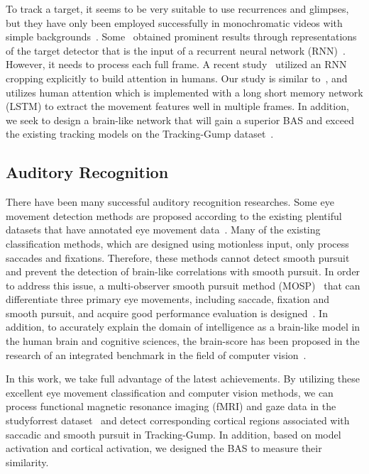 \documentclass[journal]{IEEEtran}
\begin{document}
To track a target, it seems to be very suitable to use recurrences and glimpses, but they have only been employed successfully in monochromatic videos with simple backgrounds~\cite{RATM}. 
Some~\cite{ning2017spatially} obtained prominent results through representations of the target detector that is the input of a recurrent neural network (RNN)~\cite{su2020improved}.
However, it needs to process each full frame. 
A recent study~\cite{gordon2017re3} utilized an RNN cropping explicitly to build attention in humans. 
Our study is similar to~\cite{RATM,luo2019teleoperation}, and utilizes human attention which is implemented with a long short memory network (LSTM) to extract the movement features well in multiple frames. 
In addition, we seek to design a brain-like network that will gain a superior BAS and exceed the existing tracking models on the Tracking-Gump dataset~\cite{gaze_forrest}.
\par


\subsection{Auditory Recognition}
There have been many successful auditory recognition researches. 
Some eye movement detection methods are proposed according to the existing plentiful datasets that have annotated eye movement data~\cite{dorr2010variability,mathe2012dynamic,hooge2017is,blstm_class}. 
Many of the existing classification methods, which are designed using motionless input, only process saccades and fixations. 
Therefore, these methods cannot detect smooth pursuit and prevent the detection of brain-like correlations with smooth pursuit. 
In order to address this issue, a multi-observer smooth pursuit method (MOSP)~\cite{mosp} that can differentiate three primary eye movements, including saccade, fixation and smooth pursuit, 
and acquire good performance evaluation is designed~\cite{blstm_class}.
In addition, to accurately explain the domain of  intelligence as a brain-like model in the human brain and cognitive sciences, 
the brain-score has been proposed in the research of an integrated benchmark in the field of computer vision~\cite{schrimpf2020integrative}. 

In this work, we take full advantage of the latest achievements. 
By utilizing these excellent eye movement classification and computer vision methods, 
we can process functional magnetic resonance imaging (fMRI) and gaze data in the studyforrest dataset~\cite{gaze_forrest} 
and detect corresponding cortical regions associated with saccadic and smooth pursuit in Tracking-Gump.
In addition, based on model activation and cortical activation, we designed the BAS to measure their similarity.
\end{document}

